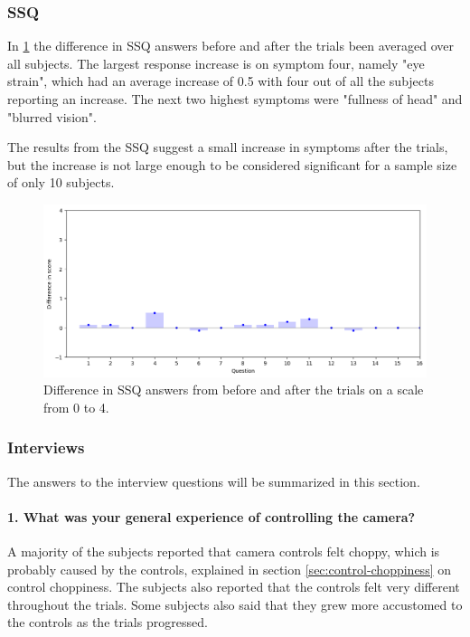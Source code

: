 \documentclass[nofilelist]{cslthse-msc}
\begin{document}
\subsubsection{SSQ}
In \ref{fig:ssq-ans} the difference in SSQ answers before and after the trials been averaged over all subjects. The largest response increase is on symptom four, namely "eye strain", which had an average increase of  0.5 with four out of all the subjects reporting an increase. The next two highest symptoms were "fullness of head" and "blurred vision". 

The results from the SSQ suggest a small increase in  symptoms after the trials, but the increase is not large enough to be considered significant for a sample size of only 10 subjects.

\begin{figure}[!hbt]
   \centering
   \includegraphics[scale=0.6]{images/ssq-results.png} 
   \caption{Difference in SSQ answers from before and after the trials on a scale from 0 to 4.}
   \label{fig:ssq-ans}
\end{figure}

\subsubsection{Interviews}
The answers to the interview questions will be summarized in this section.

\titleformat{\paragraph}[hang]{\normalfont\small\bfseries}{\theparagraph}{1em}{}

\paragraph{1. What was your general experience of controlling the camera?}
A majority of the subjects reported that camera controls felt choppy, which is probably caused by the controls, explained in section \ref{sec:control-choppiness} on control choppiness. The subjects also reported that the controls felt very different throughout the trials. Some subjects also said that they grew more accustomed to the controls as the trials progressed.
\end{document}
